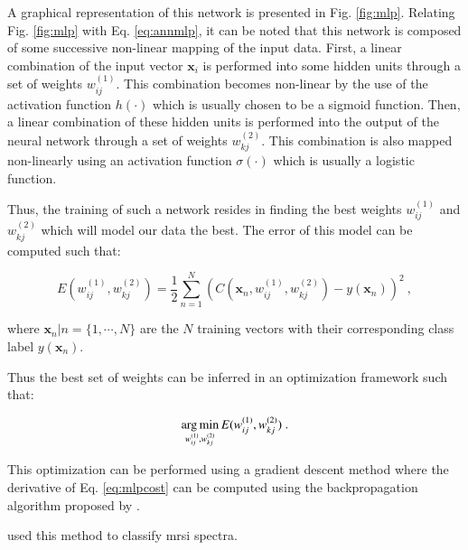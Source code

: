 \begin{enumerate}[leftmargin=*]
A graphical representation of this network is presented in Fig. \ref{fig:mlp}. Relating Fig. \ref{fig:mlp} with Eq. \eqref{eq:annmlp}, it can be noted that this network is composed of some successive non-linear mapping of the input data. First, a linear combination of the input vector $\mathbf{x}_i$ is performed into some hidden units through a set of weights $w_{ij}^{(1)}$. This combination becomes non-linear by the use of the activation function $h(\cdot)$ which is usually chosen to be a sigmoid function. Then, a linear combination of these hidden units is performed into the output of the neural network through a set of weights $w_{kj}^{(2)}$. This combination is also mapped non-linearly using an activation function $\sigma(\cdot)$ which is usually a logistic function.

Thus, the training of such a network resides in finding the best weights $w_{ij}^{(1)}$ and $ w_{kj}^{(2)}$ which will model our data the best. The error of this model can be computed such that:

\begin{equation}
	E(w_{ij}^{(1)},w_{kj}^{(2)}) = \frac{1}{2} \sum_{n=1}^{N} \left( C(\mathbf{x}_n,w_{ij}^{(1)},w_{kj}^{(2)}) - y(\mathbf{x}_n) \right) ^{2} \ ,
	\label{eq:mlpcost}
\end{equation}

\noindent where $\mathbf{x}_n|n=\{1,\cdots,N\}$ are the $N$ training vectors with their corresponding class label $y(\mathbf{x}_n)$.

Thus the best set of weights can be inferred in an optimization framework such that:

\begin{equation}
	\operatorname*{arg\,min}_{w_{ij}^{(1)},w_{kj}^{(2)}} E(w_{ij}^{(1)},w_{kj}^{(2)}) \ . 
	\label{eq:mlpopt}
\end{equation}

This optimization can be performed using a gradient descent method where the derivative of Eq. \eqref{eq:mlpcost} can be computed using the backpropagation algorithm proposed by \cite{Rumelhart1988}.

\cite{Matulewicz2013,Parfait2012} used this method to classify \ac{mrsi} spectra.

\begin{figure}
\centering
\def\layersep{3cm}
\def\finallayersep{2.2cm}
\end{figure}
\end{enumerate}
